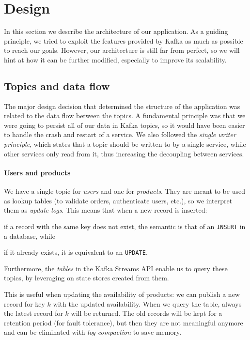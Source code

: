 \section{Design}
\label{sec:design}

In this section we describe the architecture of our application. As a guiding principle, we tried to exploit the features provided by Kafka as much as possible to reach our goals. However, our architecture is still far from perfect, so we will hint at how it can be further modified, especially to improve its scalability.

\subsection{Topics and data flow}

The major design decision that determined the structure of the application was related to the data flow between the topics.
A fundamental principle was that we were going to persist all of our data in Kafka topics, so it would have been easier to handle the crash and restart of a service. We also followed the \emph{single writer principle}, which states that a topic should be written to by a single service, while other services only read from it, thus increasing the decoupling between services.

\paragraph{Users and products}
We have a single topic for \emph{users} and one for \emph{products}.
They are meant to be used as lookup tables (to validate orders, authenticate users, etc.), so we interpret them as \emph{update logs}. This means that when a new record is inserted:
\begin{enumerate*}[label=(\roman*)]
    \item if a record with the same key does not exist, the semantic is that of an \texttt{INSERT} in a database, while
    \item if it already exists, it is equivalent to an \texttt{UPDATE}.
\end{enumerate*}
Furthermore, the \emph{tables} in the Kafka Streams API enable us to query these topics, by leveraging on state stores created from them.

This is useful when updating the availability of products: we can publish a new record for key $k$ with the updated availability. When we query the table, always the latest record for $k$ will be returned. The old records will be kept for a retention period (for fault tolerance), but then they are not meaningful anymore and can be eliminated with \emph{log compaction} to save memory.

